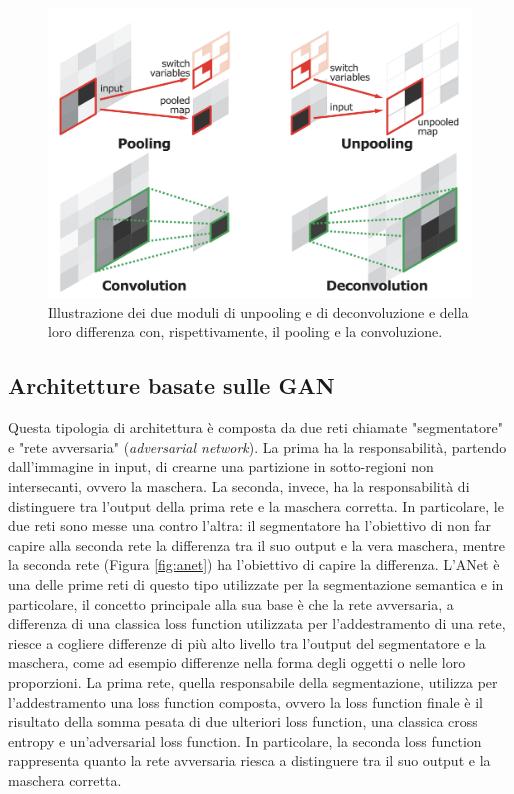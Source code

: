 \begin{figure}[h!]
    \centering
    \hspace*{0.1in}
    \includegraphics[scale=0.35]{img/deconv.png}
    \caption{Illustrazione dei due moduli di unpooling e di deconvoluzione \cite{deconvnet} e della loro differenza con, rispettivamente, il pooling e la convoluzione.}
    \label{fig:deconv}
\end{figure}
 
 

 
\subsection{Architetture basate sulle GAN}
Questa tipologia di architettura è composta da due reti chiamate "segmentatore" e "rete avversaria" (\textit{adversarial network}). La prima ha la responsabilità, partendo dall'immagine in input, di crearne una partizione in sotto-regioni non intersecanti, ovvero la maschera. La seconda, invece, ha la responsabilità di distinguere tra l'output della prima rete e la maschera corretta. In particolare, le due reti sono messe una contro l'altra: il segmentatore ha l'obiettivo di non far capire alla seconda rete la differenza tra il suo output e la vera maschera, mentre la seconda rete (Figura \ref{fig:anet}) ha l'obiettivo di capire la differenza. L'ANet \cite{anet} è una delle prime reti di questo tipo utilizzate per la segmentazione semantica e in particolare, il concetto principale alla sua base è che la rete avversaria, a differenza di una classica loss function utilizzata per l'addestramento di una rete, riesce a cogliere differenze di più alto livello tra l'output del segmentatore e la maschera, come ad esempio differenze nella forma degli oggetti o nelle loro proporzioni. La prima rete, quella responsabile della segmentazione, utilizza per l'addestramento una loss function composta, ovvero la loss function finale è il risultato della somma pesata di due ulteriori loss function, una classica cross entropy e un'adversarial loss function. In particolare, la seconda loss function rappresenta quanto la rete avversaria riesca a distinguere tra il suo output e la maschera corretta.
 

